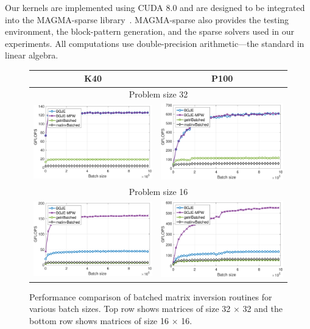 Our kernels are implemented using CUDA 8.0 and are designed to be integrated
into the MAGMA-sparse library~\cite{magma}. MAGMA-sparse also provides the
testing environment, the block-pattern generation, and the sparse solvers used
in our experiments. All computations use double-precision arithmetic---the
standard in linear algebra.

\begin{figure}
\begin{center}
{\scriptsize
\begin{tabular}{cc}
K40 & P100\\
\hline
\multicolumn{2}{c}{Problem size 32}\\
\includegraphics[width=.46\columnwidth]{plots/gje_n_d_K40_32.pdf}&
\includegraphics[width=.46\columnwidth]{plots/gje_n_d_P100_32.pdf}\\
\hline
\multicolumn{2}{c}{Problem size 16}\\
\includegraphics[width=.46\columnwidth]{plots/gje_n_d_K40_16.pdf}&
\includegraphics[width=.46\columnwidth]{plots/gje_n_d_P100_16.pdf}
\end{tabular}
}
\end{center}
\caption{
Performance comparison of batched matrix inversion routines for various batch sizes. 
Top row shows matrices of size 32 $\times$ 32 and the bottom row shows matrices of size 16 $\times$ 16.
}
\label{2017-gje-block-jacobi:fig:bgje-mpw-performance}
\end{figure}

